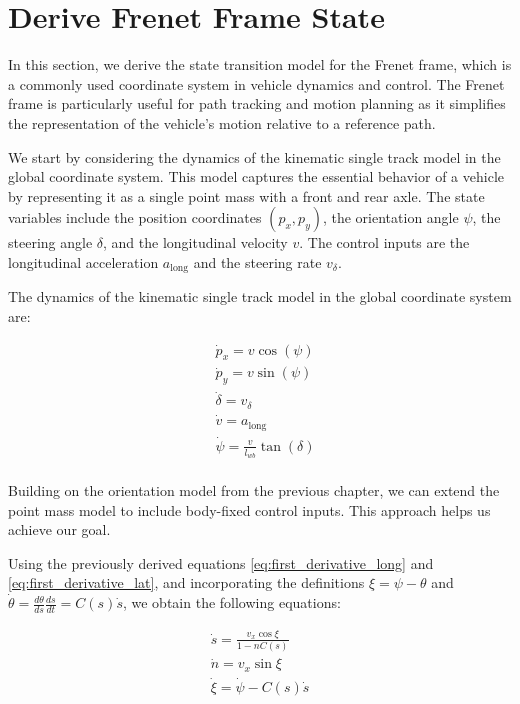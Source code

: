 
\section{Derive Frenet Frame State}
In this section, we derive the state transition model for the Frenet frame, which is a commonly used coordinate system in vehicle dynamics and
control.
The Frenet frame is particularly useful for path tracking and motion planning as it simplifies the representation of the vehicle's motion relative to
a reference path.

We start by considering the dynamics of the kinematic single track model in the global coordinate system.
This model captures the essential behavior of a vehicle by representing it as a single point mass with a front and rear axle.
The state variables include the position coordinates $(p_x, p_y)$, the orientation angle $\psi$, the steering angle $\delta$, and the longitudinal
velocity $v$.
The control inputs are the longitudinal acceleration $a_{\text{long}}$ and the steering rate $v_{\delta}$.

The dynamics of the kinematic single track model in the global coordinate system are:

\begin{align*}
	 & \dot{p}_x = v\cos(\psi)                    \\
	 & \dot{p}_y = v\sin(\psi)                    \\
	 & \dot{\delta} = v_{\delta}                  \\
	 & \dot{v} = a_{\text{long}}                  \\
	 & \dot{\psi} = \frac{v}{l_{wb}} \tan(\delta) \\
\end{align*}

Building on the orientation model from the previous chapter, we can extend the point mass model to include body-fixed control inputs.
This approach helps us achieve our goal.

Using the previously derived equations \ref{eq:first_derivative_long} and \ref{eq:first_derivative_lat}, and incorporating the
definitions $\xi = \psi - \theta$ and $\dot{\theta}=\frac{d\theta}{ds}\frac{ds}{dt}=C(s)\dot{s}$, we obtain
the following equations:

\begin{align*}
	\dot{s} = \frac{v_x\cos{\xi}}{1-nC(s)} \\
	\dot{n} = v_x\sin{\xi}                 \\
	\dot{\xi} = \dot{\psi} - C(s)\dot{s}   \\
\end{align*}

